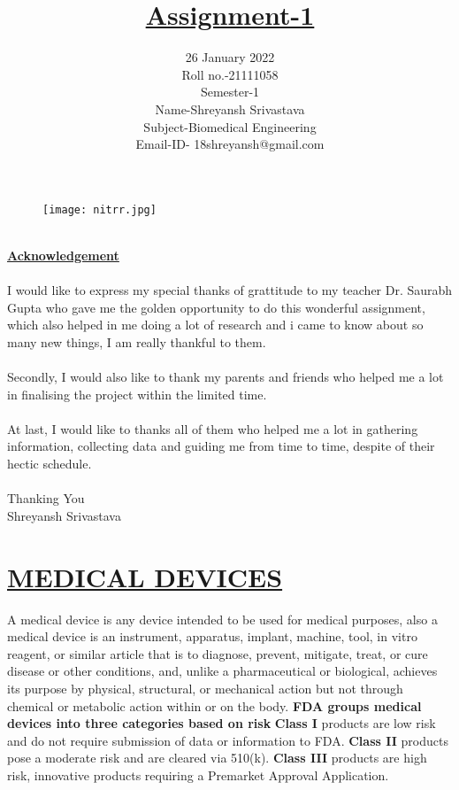\documentclass[12pt]{article}
\title{\textbf{\underline{Assignment-1}}}
\date{26 January 2022\\Roll no.-21111058\\Semester-1\\\Large {Name-Shreyansh Srivastava}\\Subject-Biomedical Engineering\\Email-ID- 18shreyansh@gmail.com}
\begin{document}
   \maketitle
   	\begin{figure}[h]
    	\centering
   	    \texttt{[image: nitrr.jpg]}
   	\end{figure}
   \clearpage
      \begin{Acknowledgement}
         \\\Huge{\textbf{\underline{Acknowledgement}}}\\
         \\\large I would like to express my special thanks of grattitude to my teacher Dr. Saurabh Gupta who gave me the golden opportunity to do this wonderful assignment, which also helped in me doing a lot of research and i came to know about so many new things, I am really thankful to them.\\\\
         Secondly, I would also like to thank my parents and friends who helped me a lot in finalising the project within the limited time.\\\\
         At last, I would like to thanks all of them who helped me a lot in gathering information, collecting data and guiding me from time to time, despite of their hectic schedule.\\\\
         Thanking You\\
         Shreyansh Srivastava
    
   
      \end{Acknowledgement}
   \clearpage
   \tableofcontents
   \clearpage
   \section{{\textbf{\underline{{\large MEDICAL DEVICES} }}}}
    	
     A medical device is any device intended to be used for medical purposes, also a medical device is an instrument, apparatus, implant, machine, tool, in vitro reagent, or similar article that is to diagnose, prevent, mitigate, treat, or cure disease or other conditions, and, unlike a pharmaceutical or biological, achieves its purpose by physical, structural, or mechanical action but not through chemical or metabolic action within or on the body. \linebreak \linebreak
    \textbf{ FDA groups medical devices into three categories based on risk} \linebreak
     \textbf{Class I} products are low risk and do not require submission of data or information to FDA.\linebreak
     \textbf{Class II} products pose a moderate risk and are cleared via 510(k).\linebreak
     \textbf{Class III} products are high risk, innovative products requiring a Premarket Approval Application. 
\end{document}
